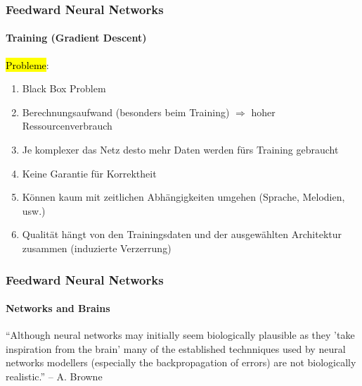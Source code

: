 \documentclass[german,aspectratio=169]{beamer}
\begin{document}


\begin{frame}
	\frametitle{Feedward Neural Networks}
	\framesubtitle{Training (Gradient Descent)}
	\hl{Probleme}:
	\begin{enumerate}[label=$\bullet$]
		\item Black Box Problem
		\item Berechnungsaufwand (besonders beim Training) $\Rightarrow$ hoher Ressourcenverbrauch
		\item Je komplexer das Netz desto mehr Daten werden fürs Training gebraucht
		\item Keine Garantie für Korrektheit
		\item Können kaum mit zeitlichen Abhängigkeiten umgehen (Sprache, Melodien, usw.)
		\item Qualität hängt von den Trainingsdaten und der ausgewählten Architektur zusammen (induzierte Verzerrung)
	\end{enumerate}
\end{frame}

\begin{frame}
	\frametitle{Feedward Neural Networks}
	\framesubtitle{Networks and Brains}
	\begin{quoting}
		``Although neural networks may initially seem biologically plausible as they 'take inspiration from the brain' many of the established technniques used by neural networks modellers (especially the backpropagation of errors) are not biologically realistic.'' -- A. Browne 
	\end{quoting}
\end{frame}
\end{document}
